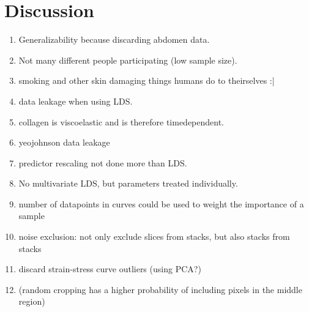 \chapter{Discussion}

\begin{enumerate}
    \item Generalizability because discarding abdomen data.
    \item Not many different people participating (low sample size).
    \item smoking and other skin damaging things humans do to theirselves :|
    \item data leakage when using LDS.
    \item collagen is viscoelastic and is therefore timedependent.
    \item yeojohnson data leakage
    \item predictor rescaling not done more than LDS.
    \item No multivariate LDS, but parameters treated individually.
    \item number of datapoints in curves could be used to weight the importance of a sample
    \item noise exclusion: not only exclude slices from stacks, but also stacks from stacks
    \item discard strain-stress curve outliers (using PCA?)
    \item (random cropping has a higher probability of including pixels in the middle region)
\end{enumerate}